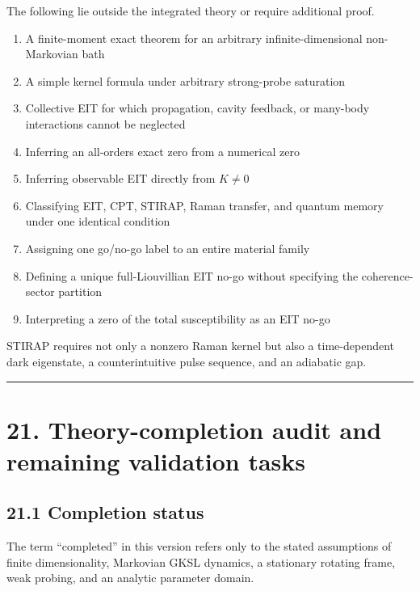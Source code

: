 \documentclass[
  10pt,
  a4paper,
]{article}
\providecommand{\tightlist}{%
  \setlength{\itemsep}{0pt}\setlength{\parskip}{0pt}}
\begin{document}
The following lie outside the integrated theory or require additional
proof.

\begin{enumerate}
\def\labelenumi{\arabic{enumi}.}
\tightlist
\item
  A finite-moment exact theorem for an arbitrary infinite-dimensional
  non-Markovian bath
\item
  A simple kernel formula under arbitrary strong-probe saturation
\item
  Collective EIT for which propagation, cavity feedback, or many-body
  interactions cannot be neglected
\item
  Inferring an all-orders exact zero from a numerical zero
\item
  Inferring observable EIT directly from \(K\neq0\)
\item
  Classifying EIT, CPT, STIRAP, Raman transfer, and quantum memory under
  one identical condition
\item
  Assigning one go/no-go label to an entire material family
\item
  Defining a unique full-Liouvillian EIT no-go without specifying the
  coherence-sector partition
\item
  Interpreting a zero of the total susceptibility as an EIT no-go
\end{enumerate}

STIRAP requires not only a nonzero Raman kernel but also a
time-dependent dark eigenstate, a counterintuitive pulse sequence, and
an adiabatic gap.

\begin{center}\rule{0.5\linewidth}{0.5pt}\end{center}

\section{21. Theory-completion audit and remaining validation
tasks}\label{theory-completion-audit-and-remaining-validation-tasks}

\subsection{21.1 Completion status}\label{completion-status}

The term ``completed'' in this version refers only to the stated
assumptions of finite dimensionality, Markovian GKSL dynamics, a
stationary rotating frame, weak probing, and an analytic parameter
domain.
\end{document}
